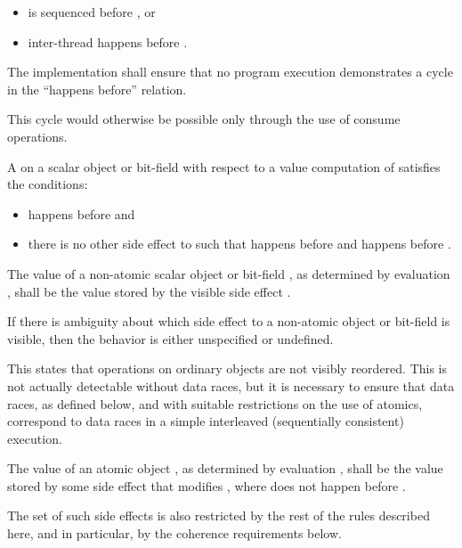\begin{itemize}
\item {} is sequenced before , or
\item {} inter-thread happens before .
\end{itemize}

The implementation shall ensure that no program execution demonstrates a cycle
in the ``happens before'' relation. \begin{note} This cycle would otherwise be
possible only through the use of consume operations. \end{note}

\pnum
A   on a scalar object or bit-field 
with respect to a value computation  of  satisfies the
conditions:

\begin{itemize}
\item {} happens before  and
\item there is no other
%
side effect  to  such that 
happens before  and  happens before .
\end{itemize}

The value of a non-atomic scalar object or bit-field , as determined by
evaluation , shall be the value stored by the
%
visible side effect
. \begin{note} If there is ambiguity about which side effect to a
non-atomic object or bit-field is visible, then the behavior is either
unspecified or undefined. \end{note} \begin{note} This states that operations on
ordinary objects are not visibly reordered. This is not actually detectable
without data races, but it is necessary to ensure that data races, as defined
below, and with suitable restrictions on the use of atomics, correspond to data
races in a simple interleaved (sequentially consistent) execution. \end{note}

\pnum
The value of an
atomic object , as determined by evaluation , shall be the value
stored by some
side effect  that modifies , where  does not happen
before .
\begin{note}
The set of such side effects is also restricted by the rest of the rules
described here, and in particular, by the coherence requirements below.
\end{note}

